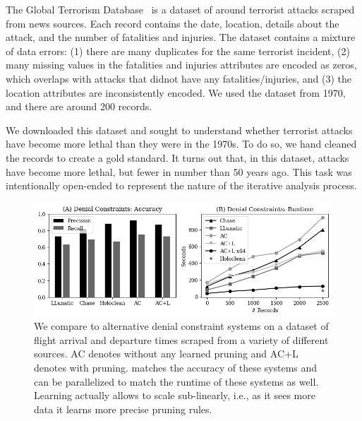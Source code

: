  The Global Terrorism Database~\cite{data-terrorism} is a dataset of around terrorist attacks scraped from news sources.  Each record contains the date, location, details about the attack, and the number of fatalities and injuries.  The dataset contains a mixture of data errors:
(1) there are many duplicates for the same terrorist incident,
(2) many missing values in the fatalities and injuries attributes are encoded as zeros, which overlaps with attacks that didnot have any fatalities/injuries, and
(3) the location attributes are inconsistently encoded.  
We used the dataset from 1970, and there are around $200$ records.  

We downloaded this dataset and sought to understand whether terrorist attacks have become more lethal than they were in the 1970s.  To do so, we hand cleaned the records to create a gold standard.  It turns out that, in this dataset, attacks have become more lethal, but fewer in number than 50 years ago.  This task was intentionally open-ended to represent the nature of the iterative analysis process.







\begin{figure}
    \centering
    \includegraphics[width=\columnwidth]{exp/exp1.png}
    \caption{We compare \sys to alternative denial constraint systems on a dataset of flight arrival and departure times scraped from a variety of different sources. AC denotes \sys without any learned pruning and AC+L denotes \sys with pruning.
    \sys matches the accuracy of these systems and can be parallelized to match the runtime of these systems as well. Learning actually allows \sys to scale sub-linearly, i.e., as it sees more data it learns more precise pruning rules.\label{exp1a}}
\end{figure}

